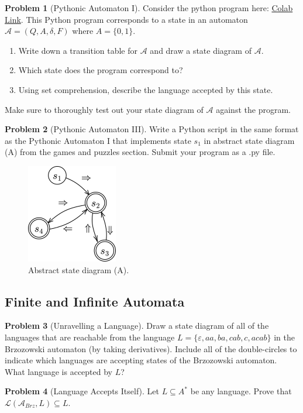 \documentclass[11pt]{article}
\theoremstyle{theorem} %
\theoremstyle{definition} %
\newtheorem{problem}                    {{\color{BurntOrange}Problem}}
\theoremstyle{remark} %
\begin{document}
\begin{problem}
    [Pythonic Automaton I]
    Consider the python program here: 
    \href{https://colab.research.google.com/drive/1rHdYUT2oZc2GF6BTtsHksiUO_GJ64Vsx?usp=sharing}{Colab Link}.
    This Python program corresponds to a state in an automaton \(\mathcal A = (Q, A, \delta, F)\) where \(A = \{0,1\}\).
    \begin{enumerate}
        \item Write down a transition table for \(\mathcal A\) and draw a state diagram of \(\mathcal A\).
        \item Which state does the program correspond to?
        \item Using set comprehension, describe the language accepted by this state.
    \end{enumerate}
    Make sure to thoroughly test out your state diagram of \(\mathcal A\) against the program.
\end{problem}

\begin{problem}
    [Pythonic Automaton III]
    Write a Python script in the same format as the Pythonic Automaton I that implements state \(s_1\) in abstract state diagram (A) from the games and puzzles section. 
    Submit your program as a .py file.

    \begin{figure}[h]
        \centering
        \includegraphics{../imgs/reverseengineering.png}
        \caption{Abstract state diagram (A).}
    \end{figure}
\end{problem}

\subsection*{Finite and Infinite Automata}

\begin{problem}
    [Unravelling a Language]
    Draw a state diagram of all of the languages that are reachable from the language \(L = \{\varepsilon, aa, ba, cab, c, acab\}\) in the Brzozowski automaton (by taking derivatives). 
    Include all of the double-circles to indicate which languages are accepting states of the Brzozowski automaton.
    What language is accepted by \(L\)?
\end{problem}

\begin{problem}
    [Language Accepts Itself]
    Let \(L \subseteq A^*\) be any language. 
    Prove that \(\mathcal L(\mathcal A_{Brz}, L) \subseteq L\).
\end{problem}
\end{document}
